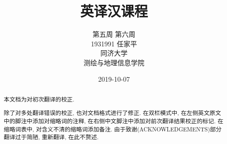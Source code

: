 \documentclass[a4paper, UTF8, 12pt]{article}
\begin{document}
\title{\Huge 英译汉课程}
\author{\Large 
        第五周 第六周 \\[12pt]
        1931991 任家平 \\[12pt]
        同济大学 \\[12pt]
        测绘与地理信息学院}
\date{2019-10-07}

\maketitle

\begin{abstract}
    本文档为对初次翻译的校正. 
    
    除了对多处翻译错误的校正, 也对文档格式进行了修正. 在双栏模式中, 在左侧英文原文中的脚注中添加对缩略词的注释, 在右侧中文脚注中添加对前次翻译结果校正的标记. 在缩略词表中, 对含义不清的缩略词添加备注. 由于致谢(ACKNOWLEDGEMENTS)部分翻译过于简陋, 重新翻译, 在此不赘述.
\end{abstract}
\thispagestyle{empty}

\newpage
{}
\tableofcontents
{}

\newpage
{}
\end{document}

